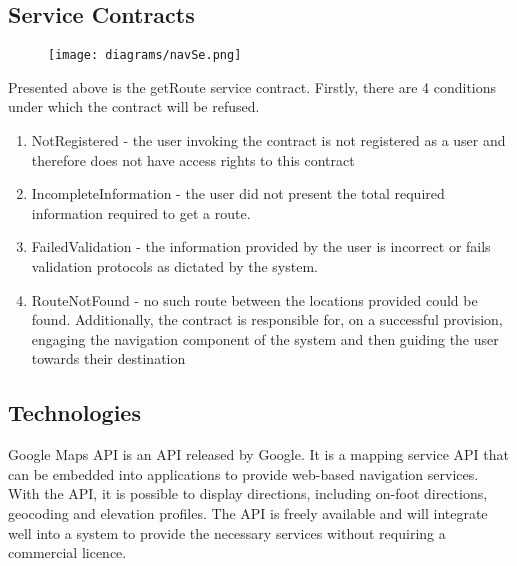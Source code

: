 \documentclass[12pt]{article}
\begin{document}
\subsection{Service Contracts}
\begin{figure}
\centering
\texttt{[image: diagrams/navSe.png]}
\end{figure}
Presented above is the getRoute service contract. Firstly, there are 4 conditions under which the contract will be refused. 
\begin{enumerate}
\item NotRegistered - the user invoking the contract is not registered as a user and therefore does not have access rights to this contract
\item IncompleteInformation - the user did not present the total required information required to get a route.

\item FailedValidation - the information provided by the user is incorrect or fails validation protocols as dictated by the system.

\item RouteNotFound - no such route between the locations provided could be found.
Additionally, the contract is responsible for, on a successful provision, engaging the navigation component of the system and then guiding the user towards their destination

\end{enumerate}

\subsection{Technologies}
Google Maps API is an API released by Google. It is a mapping service API that can be embedded into applications to provide web-based navigation services. With the API, it is possible to display directions, including on-foot directions, geocoding and elevation profiles. The API is freely available and will integrate well into a system to provide the necessary services without requiring a commercial licence.
\end{document}
